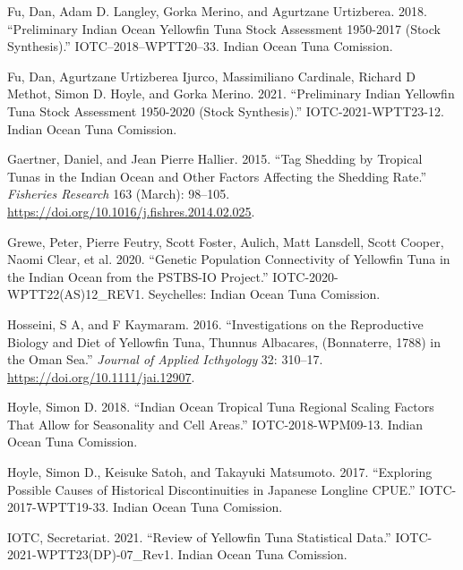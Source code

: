 \documentclass[
]{scrartcl}
\newlength{\cslhangindent}
\newenvironment{CSLReferences}[2] %
 {\begin{list}{}{%
  \setlength{\itemindent}{0pt}
  \setlength{\leftmargin}{0pt}
  \setlength{\parsep}{0pt}
  \ifodd #1
   \setlength{\leftmargin}{\cslhangindent}
   \setlength{\itemindent}{-1\cslhangindent}
  \fi
  \setlength{\itemsep}{#2\baselineskip}}}
 {\end{list}}
\begin{document}
\begin{CSLReferences}{1}{0}
Fu, Dan, Adam D. Langley, Gorka Merino, and Agurtzane Urtizberea. 2018.
{``Preliminary {Indian Ocean Yellowfin Tuna Stock Assessment} 1950-2017
({Stock Synthesis}).''} IOTC--2018--WPTT20--33. Indian Ocean Tuna
Comission.

Fu, Dan, Agurtzane Urtizberea Ijurco, Massimiliano Cardinale, Richard D
Methot, Simon D. Hoyle, and Gorka Merino. 2021. {``Preliminary {Indian
Yellowfin} Tuna Stock Assessment 1950-2020 ({Stock Synthesis}).''}
IOTC-2021-WPTT23-12. Indian Ocean Tuna Comission.

Gaertner, Daniel, and Jean Pierre Hallier. 2015. {``Tag Shedding by
Tropical Tunas in the {Indian Ocean} and Other Factors Affecting the
Shedding Rate.''} \emph{Fisheries Research} 163 (March): 98--105.
\url{https://doi.org/10.1016/j.fishres.2014.02.025}.

Grewe, Peter, Pierre Feutry, Scott Foster, Aulich, Matt Lansdell, Scott
Cooper, Naomi Clear, et al. 2020. {``Genetic Population Connectivity of
Yellowfin Tuna in the {Indian Ocean} from the {PSTBS-IO Project}.''}
IOTC-2020-WPTT22(AS)12\_REV1. Seychelles: Indian Ocean Tuna Comission.

Hosseini, S A, and F Kaymaram. 2016. {``Investigations on the
Reproductive Biology and Diet of Yellowfin Tuna, {Thunnus} Albacares,
({Bonnaterre}, 1788) in the {Oman Sea}.''} \emph{Journal of Applied
Icthyology} 32: 310--17. \url{https://doi.org/10.1111/jai.12907}.

Hoyle, Simon D. 2018. {``Indian {Ocean} Tropical Tuna Regional Scaling
Factors That Allow for Seasonality and Cell Areas.''}
IOTC-2018-WPM09-13. Indian Ocean Tuna Comission.

Hoyle, Simon D., Keisuke Satoh, and Takayuki Matsumoto. 2017.
{``Exploring Possible Causes of Historical Discontinuities in {Japanese}
Longline {CPUE}.''} IOTC-2017-WPTT19-33. Indian Ocean Tuna Comission.

IOTC, Secretariat. 2021. {``Review of {Yellowfin Tuna Statistical
Data}.''} IOTC-2021-WPTT23(DP)-07\_Rev1. Indian Ocean Tuna Comission.


\end{CSLReferences}
\end{document}
